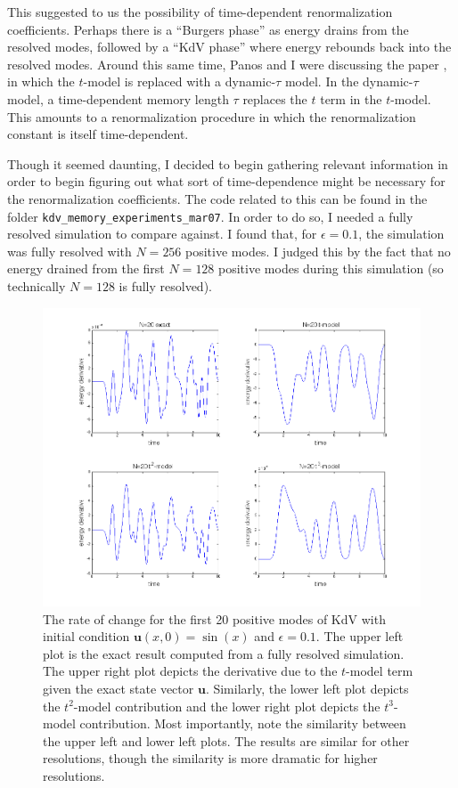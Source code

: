 \documentclass{article}
\begin{document}
This suggested to us the possibility of time-dependent renormalization coefficients. Perhaps there is a ``Burgers phase'' as energy drains from the resolved modes, followed by a ``KdV phase'' where energy rebounds back into the resolved modes. Around this same time, Panos and I were discussing the paper \cite{parish2016dynamic}, in which the $t$-model is replaced with a dynamic-$\tau$ model. In the dynamic-$\tau$ model, a time-dependent memory length $\tau$ replaces the $t$ term in the $t$-model. This amounts to a renormalization procedure in which the renormalization constant is itself time-dependent.

Though it seemed daunting, I decided to begin gathering relevant information in order to begin figuring out what sort of time-dependence might be necessary for the renormalization coefficients. The code related to this can be found in the folder \verb!kdv_memory_experiments_mar07!. In order to do so, I needed a fully resolved simulation to compare against. I found that, for $\epsilon=0.1$, the simulation was fully resolved with $N=256$ positive modes. I judged this by the fact that no energy drained from the first $N=128$ positive modes during this simulation (so technically $N=128$ is fully resolved).

\begin{figure}[h]
\includegraphics[width=\textwidth]{comparing_energy_derivatives.png}
\caption{The rate of change for the first 20 positive modes of KdV with initial condition $\mathbf{u}(x,0) = \sin(x)$ and $\epsilon=0.1$. The upper left plot is the exact result computed from a fully resolved simulation. The upper right plot depicts the derivative due to the $t$-model term given the exact state vector $\mathbf{u}$. Similarly, the lower left plot depicts the $t^2$-model contribution and the lower right plot depicts the $t^3$-model contribution. Most importantly, note the similarity between the upper left and lower left plots. The results are similar for other resolutions, though the similarity is more dramatic for higher resolutions.}\label{fig:t2_energy_comparison}
\end{figure}
\end{document}
